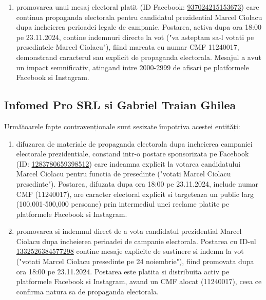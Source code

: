 \documentclass[a4paper,12pt]{article}
\begin{document}
\begin{enumerate}[leftmargin=*, label=\arabic*.)]
    \item promovarea unui mesaj electoral platit (ID Facebook: \href{https://www.facebook.com/ads/library/?id=937024215153673}{937024215153673}) care continua propaganda electorala pentru candidatul prezidential Marcel Ciolacu dupa incheierea perioadei legale de campanie. Postarea, activa dupa ora 18:00 pe 23.11.2024, contine indemnuri directe la vot ("va asteptam sa-l votati pe presedintele Marcel Ciolacu"), fiind marcata cu numar CMF 11240017, demonstrand caracterul sau explicit de propaganda electorala. Mesajul a avut un impact semnificativ, atingand intre 2000-2999 de afisari pe platformele Facebook si Instagram.
\end{enumerate}

\vspace{0.5cm}

\subsection{Infomed Pro SRL si Gabriel Traian Ghilea}
Următoarele fapte contravenționale sunt sesizate împotriva acestei entități:

\begin{enumerate}[leftmargin=*, label=\arabic*.)]
    \item difuzarea de materiale de propaganda electorala dupa incheierea campaniei electorale prezidentiale, constand intr-o postare sponsorizata pe Facebook (ID: \href{https://www.facebook.com/ads/library/?id=1283780659398512}{1283780659398512}) care indeamna explicit la votarea candidatului Marcel Ciolacu pentru functia de presedinte ("votati Marcel Ciolacu presedinte"). Postarea, difuzata dupa ora 18:00 pe 23.11.2024, include numar CMF (11240017), are caracter electoral explicit si targeteaza un public larg (100,001-500,000 persoane) prin intermediul unei reclame platite pe platformele Facebook si Instagram.
    \item promovarea si indemnul direct de a vota candidatul prezidential Marcel Ciolacu dupa incheierea perioadei de campanie electorala. Postarea cu ID-ul \href{https://www.facebook.com/ads/library/?id=1332526384577298}{1332526384577298} contine mesaje explicite de sustinere si indemn la vot ("votati Marcel Ciolacu presedinte pe 24 noiembrie"), fiind promovata dupa ora 18:00 pe 23.11.2024. Postarea este platita si distribuita activ pe platformele Facebook si Instagram, avand un CMF alocat (11240017), ceea ce confirma natura sa de propaganda electorala.
\end{enumerate}
\end{document}
